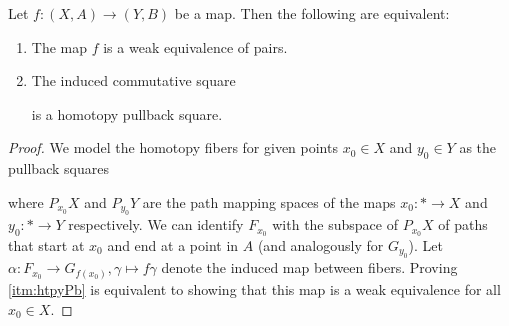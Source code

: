 \begin{lemma}\label{lem:weOfaPairsIsHtpyPb}
    Let $f\colon(X,A)\to (Y,B)$ be a map.
    Then the following are equivalent:
    \begin{enumerate}[label={(\roman*)}]
        \item The map $f$ is a weak equivalence of pairs. \label{itm:weOfPairs}
        \item The induced commutative square \begin{center} 
        \end{center}
        is a homotopy pullback square. \label{itm:htpyPb}
    \end{enumerate}
    \begin{proof}
        We model the homotopy fibers for given points $x_0\in X$ and $y_0\in Y$ as the pullback squares
        \begin{center} 
        \end{center}
        where $P_{x_0}X$ and $P_{y_0}Y$ are the path mapping spaces of the maps $x_0\colon *\to X$ and  $y_0\colon *\to Y$ respectively.
        We can identify $F_{x_0}$ with the subspace of $P_{x_0}X$ of paths that start at $x_0$ and end at a point in $A$ (and analogously for $G_{y_0}$).
        Let $\alpha\colon F_{x_0}\to G_{f(x_0)}, \gamma\mapsto f\gamma$ denote the induced map between fibers.
        Proving \ref{itm:htpyPb} is equivalent to showing that this map is a weak equivalence for all $x_0\in X$.


\end{proof}
\end{lemma}
